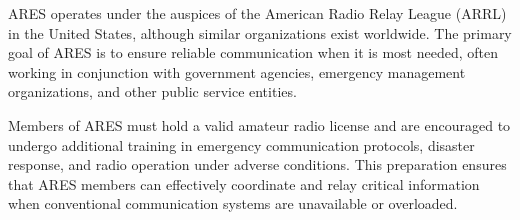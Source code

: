 ARES operates under the auspices of the American Radio Relay League (ARRL) in the United States, although similar organizations exist worldwide. The primary goal of ARES is to ensure reliable communication when it is most needed, often working in conjunction with government agencies, emergency management organizations, and other public service entities.

Members of ARES must hold a valid amateur radio license and are encouraged to undergo additional training in emergency communication protocols, disaster response, and radio operation under adverse conditions. This preparation ensures that ARES members can effectively coordinate and relay critical information when conventional communication systems are unavailable or overloaded.

